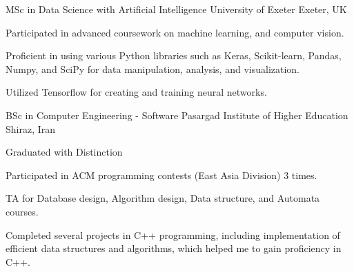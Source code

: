 

\begin{cventries}

  \cventry
    {MSc in Data Science with Artificial Intelligence} %
    {University of Exeter} %
    {Exeter, UK} %
    {} %
    {
      \begin{cvitems} %
        \item {Participated in advanced coursework on machine learning, and computer vision.}
        \item {Proficient in using various Python libraries such as Keras, Scikit-learn, Pandas, Numpy, and SciPy for data manipulation, analysis, and visualization.}
        \item {Utilized Tensorflow for creating and training neural networks.}
      \end{cvitems}
    }
    
  \cventry
    {BSc in Computer Engineering - Software} %
    {Pasargad Institute of Higher Education} %
    {Shiraz, Iran} %
    {} %
    {
      \begin{cvitems} %
        \item {Graduated with Distinction}
        \item {Participated in ACM programming contests (East Asia Division) 3 times.}
        \item {TA for Database design, Algorithm design, Data structure, and Automata courses.}
        \item {Completed several projects in C++ programming, including implementation of efficient data structures and algorithms, which helped me to gain proficiency in C++.}
      \end{cvitems}
    }
\end{cventries}
